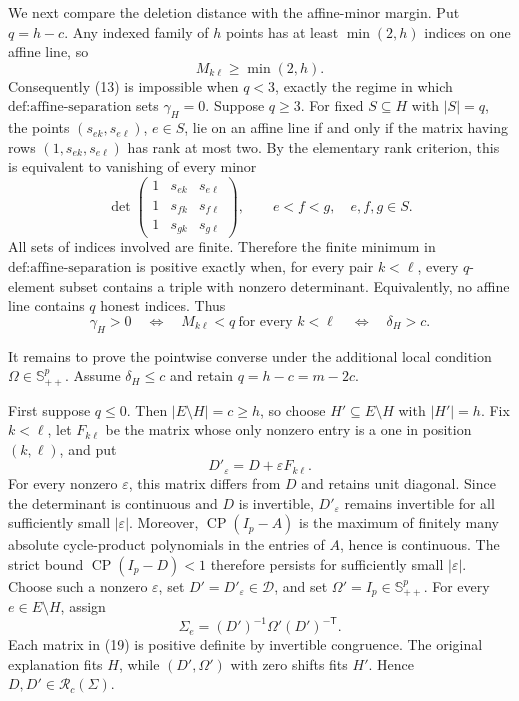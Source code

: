 We next compare the deletion distance with the affine-minor margin.  Put \(q=h-c\).  Any indexed family of \(h\) points has at least \(\min(2,h)\) indices on one affine line, so
\[
 M_{k\ell}\ge\min(2,h).
 \tag{15}
\]
Consequently (13) is impossible when \(q<3\), exactly the regime in which \(\text{def:affine-separation}\) sets \(\gamma_H=0\).  Suppose \(q\ge3\).  For fixed \(S\subseteq H\) with \(|S|=q\), the points \((s_{ek},s_{e\ell})\), \(e\in S\), lie on an affine line if and only if the matrix having rows \((1,s_{ek},s_{e\ell})\) has rank at most two.  By the elementary rank criterion, this is equivalent to vanishing of every minor
\[
 \det\begin{pmatrix}
 1&s_{ek}&s_{e\ell}\\
 1&s_{fk}&s_{f\ell}\\
 1&s_{gk}&s_{g\ell}
 \end{pmatrix},
 \qquad e<f<g,\quad e,f,g\in S.
 \tag{16}
\]
All sets of indices involved are finite.  Therefore the finite minimum in \(\text{def:affine-separation}\) is positive exactly when, for every pair \(k<\ell\), every \(q\)-element subset contains a triple with nonzero determinant.  Equivalently, no affine line contains \(q\) honest indices.  Thus
\[
 \gamma_H>0
 \quad\Longleftrightarrow\quad
 M_{k\ell}<q\ \text{for every }k<\ell
 \quad\Longleftrightarrow\quad
 \delta_H>c.
 \tag{17}
\]

It remains to prove the pointwise converse under the additional local condition \(\Omega\in\mathbb S_{++}^p\).  Assume \(\delta_H\le c\) and retain \(q=h-c=m-2c\).

First suppose \(q\le0\).  Then \(|E\setminus H|=c\ge h\), so choose \(H'\subseteq E\setminus H\) with \(|H'|=h\).  Fix \(k<\ell\), let \(F_{k\ell}\) be the matrix whose only nonzero entry is a one in position \((k,\ell)\), and put
\[
 D'_{\varepsilon}=D+\varepsilon F_{k\ell}.
 \tag{18}
\]
For every nonzero \(\varepsilon\), this matrix differs from \(D\) and retains unit diagonal.  Since the determinant is continuous and \(D\) is invertible, \(D'_{\varepsilon}\) remains invertible for all sufficiently small \(|\varepsilon|\).  Moreover, \(\operatorname{CP}(I_p-A)\) is the maximum of finitely many absolute cycle-product polynomials in the entries of \(A\), hence is continuous.  The strict bound \(\operatorname{CP}(I_p-D)<1\) therefore persists for sufficiently small \(|\varepsilon|\).  Choose such a nonzero \(\varepsilon\), set \(D'=D'_{\varepsilon}\in\mathcal D\), and set \(\Omega'=I_p\in\mathbb S_{++}^p\).  For every \(e\in E\setminus H\), assign
\[
 \Sigma_e=(D')^{-1}\Omega'(D')^{-\mathsf T}.
 \tag{19}
\]
Each matrix in (19) is positive definite by invertible congruence.  The original explanation fits \(H\), while \((D',\Omega')\) with zero shifts fits \(H'\).  Hence \(D,D'\in\mathcal R_c(\Sigma)\).

